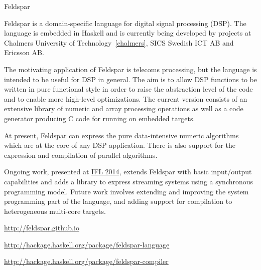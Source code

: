 \begin{hcarentry}{Feldspar}
\label{feldspar}
\makeheader

Feldspar is a domain-specific language for digital signal processing (DSP). The
language is embedded in Haskell and is currently being developed by projects at
Chalmers University of Technology~\cref{chalmers}, SICS Swedish ICT AB and
Ericsson AB.

The motivating application of Feldspar is telecoms processing, but the language
is intended to be useful for DSP in general. The aim is to allow DSP functions
to be written in pure functional style in order to raise the abstraction level of
the code and to enable more high-level optimizations. The current version consists
of an extensive library of numeric and array processing operations as well as a
code generator producing C code for running on embedded targets.

At present, Feldspar can express the pure data-intensive numeric algorithms
which are at the core of any DSP application. There is also support for the
expression and compilation of parallel algorithms.

Ongoing work, presented at \href{http://ifl2014.github.io/submissions/ifl2014_submission_23.pdf}{IFL 2014},
extends Feldspar with basic input/output capabilities and adds a library to
express streaming systems using a synchronous programming model. Future work
involves extending and improving the system programming part of the language, and
adding support for compilation to heterogeneous multi-core targets.

\FurtherReading
\begin{compactitem}
\item \url{http://feldspar.github.io}
\item \url{http://hackage.haskell.org/package/feldspar-language}
\item \url{http://hackage.haskell.org/package/feldspar-compiler}
\end{compactitem}
\end{hcarentry}
